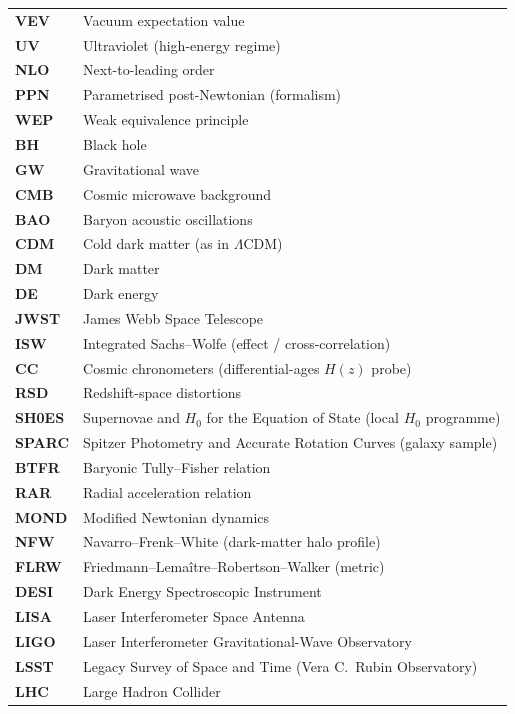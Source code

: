 \documentclass[11pt,a4paper]{article}
\begin{document}
\begin{longtable}{@{}p{2.6cm}p{12.6cm}@{}}
\textbf{VEV} & Vacuum expectation value \\
\textbf{UV} & Ultraviolet (high-energy regime) \\
\textbf{NLO} & Next-to-leading order \\
\textbf{PPN} & Parametrised post-Newtonian (formalism) \\
\textbf{WEP} & Weak equivalence principle \\
\textbf{BH} & Black hole \\
\textbf{GW} & Gravitational wave \\
\textbf{CMB} & Cosmic microwave background \\
\textbf{BAO} & Baryon acoustic oscillations \\
\textbf{CDM} & Cold dark matter (as in $\Lambda$CDM) \\
\textbf{DM} & Dark matter \\
\textbf{DE} & Dark energy \\
\textbf{JWST} & James Webb Space Telescope \\
\textbf{ISW} & Integrated Sachs--Wolfe (effect / cross-correlation) \\
\textbf{CC} & Cosmic chronometers (differential-ages $H(z)$ probe) \\
\textbf{RSD} & Redshift-space distortions \\
\textbf{SH0ES} & Supernovae and $H_0$ for the Equation of State (local $H_0$ programme) \\
\textbf{SPARC} & Spitzer Photometry and Accurate Rotation Curves (galaxy sample) \\
\textbf{BTFR} & Baryonic Tully--Fisher relation \\
\textbf{RAR} & Radial acceleration relation \\
\textbf{MOND} & Modified Newtonian dynamics \\
\textbf{NFW} & Navarro--Frenk--White (dark-matter halo profile) \\
\textbf{FLRW} & Friedmann--Lema\^itre--Robertson--Walker (metric) \\
\textbf{DESI} & Dark Energy Spectroscopic Instrument \\
\textbf{LISA} & Laser Interferometer Space Antenna \\
\textbf{LIGO} & Laser Interferometer Gravitational-Wave Observatory \\
\textbf{LSST} & Legacy Survey of Space and Time (Vera C.~Rubin Observatory) \\
\textbf{LHC} & Large Hadron Collider \\

\end{longtable}
\end{document}

